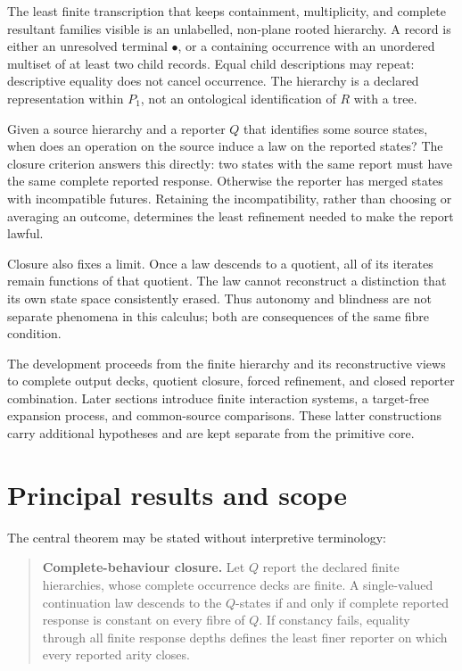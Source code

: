\documentclass[11pt,a4paper]{article}
\begin{document}
The least finite transcription that keeps containment, multiplicity, and
complete resultant families visible is an unlabelled, non-plane rooted
hierarchy. A record is either an unresolved terminal \(\bullet\), or a
containing occurrence with an unordered multiset of at least two child
records. Equal child descriptions may repeat: descriptive equality does
not cancel occurrence. The hierarchy is a declared representation within
\(P_{1}\), not an ontological identification of \(R\) with a tree.

Given a source hierarchy and a reporter \(Q\) that identifies some
source states, when does an operation on the source induce a law on the
reported states? The closure criterion answers this directly: two states
with the same report must have the same complete reported response.
Otherwise the reporter has merged states with incompatible futures.
Retaining the incompatibility, rather than choosing or averaging an
outcome, determines the least refinement needed to make the report
lawful.

Closure also fixes a limit. Once a law descends to a quotient, all of
its iterates remain functions of that quotient. The law cannot
reconstruct a distinction that its own state space consistently erased.
Thus autonomy and blindness are not separate phenomena in this calculus;
both are consequences of the same fibre condition.

The development proceeds from the finite hierarchy and its
reconstructive views to complete output decks, quotient closure, forced
refinement, and closed reporter combination. Later sections introduce
finite interaction systems, a target-free expansion process, and
common-source comparisons. These latter constructions carry additional
hypotheses and are kept separate from the primitive core.

\section{Principal results and
scope}

The central theorem may be stated without interpretive terminology:

\begin{quote}
\textbf{Complete-behaviour closure.} Let \(Q\) report the declared
finite hierarchies, whose complete occurrence decks are finite. A
single-valued continuation law descends to the \(Q\)-states if and only
if complete reported response is constant on every fibre of \(Q\). If
constancy fails, equality through all finite response depths defines the
least finer reporter on which every reported arity closes.
\end{quote}
\end{document}
